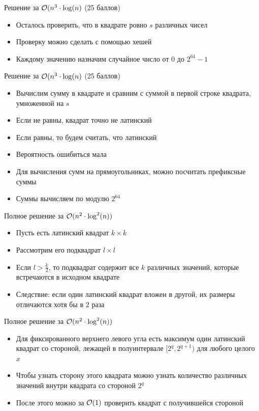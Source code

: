 \begin{frame}{Решение за $\mathcal{O}(n ^ 3 \cdot \log(n)$ (25 баллов)}
  \begin{itemize}
  \item Осталось проверить, что в квадрате ровно $s$ различных чисел
  \item Проверку можно сделать с помощью хешей
  \item Каждому значению назначим случайное число от $0$ до $2^{64} - 1$
  \end{itemize}
\end{frame}

\begin{frame}{Решение за $\mathcal{O}(n ^ 3 \cdot \log(n)$ (25 баллов)}
  \begin{itemize}
  \item Вычислим сумму в квадрате и сравним с суммой в первой строке квадрата, умноженной на $s$
  \item Если не равны, квадрат точно не латинский
  \item Если равны, то будем считать, что латинский
  \item Вероятность ошибиться мала
  \item Для вычисления сумм на прямоугольниках, можно посчитать префиксные суммы
  \item Суммы вычисляем по модулю $2^{64}$
  \end{itemize}
\end{frame}


\begin{frame}{Полное решение за $\mathcal{O}(n ^ 2 \cdot \log^2(n))$}
  \begin{itemize}
  \item Пусть есть латинский квадрат $k \times k$
  \item Рассмотрим его подквадрат $l \times l$
  \item Если $l > \frac{k}{2}$, то подквадрат содержит все $k$ различных значений, которые встречаются в исходном квадрате
  \item Следствие: если один латинский квадрат вложен в другой, их размеры отличаются хотя бы в $2$ раза
  \end{itemize}
\end{frame}

\begin{frame}{Полное решение за $\mathcal{O}(n ^ 2 \cdot \log^2(n))$}
  \begin{itemize}
  \item Для фиксированного верхнего левого угла есть максимум один латинский квадрат со стороной, лежащей в полуинтервале $[2^q, 2^{q + 1})$ для любого целого $x$
  \item Чтобы узнать сторону этого квадрата можно узнать количество различных значений внутри квадрата со стороной $2^q$
  \item После этого можно за $\mathcal{O}(1)$ проверить квадрат с получившейся стороной
  \end{itemize}
\end{frame}

